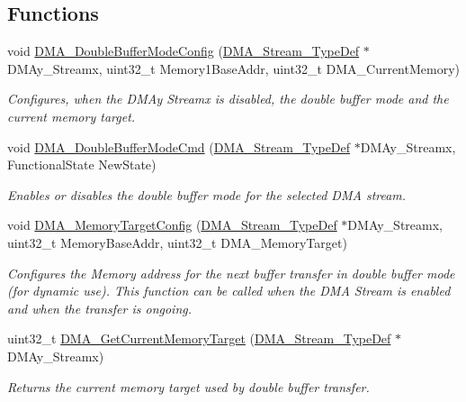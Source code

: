 \subsection*{Functions}
\begin{DoxyCompactItemize}
\item 
void \hyperlink{group___d_m_a___group3_ga8d0957e50302efaf48a16c62d14c9ca8}{D\+M\+A\+\_\+\+Double\+Buffer\+Mode\+Config} (\hyperlink{struct_d_m_a___stream___type_def}{D\+M\+A\+\_\+\+Stream\+\_\+\+Type\+Def} $\ast$D\+M\+Ay\+\_\+\+Streamx, uint32\+\_\+t Memory1\+Base\+Addr, uint32\+\_\+t D\+M\+A\+\_\+\+Current\+Memory)
\begin{DoxyCompactList}\small\item\em Configures, when the D\+M\+Ay Streamx is disabled, the double buffer mode and the current memory target. \end{DoxyCompactList}\item 
void \hyperlink{group___d_m_a___group3_ga7fe09e62ea3125db384829dab59ebe3e}{D\+M\+A\+\_\+\+Double\+Buffer\+Mode\+Cmd} (\hyperlink{struct_d_m_a___stream___type_def}{D\+M\+A\+\_\+\+Stream\+\_\+\+Type\+Def} $\ast$D\+M\+Ay\+\_\+\+Streamx, Functional\+State New\+State)
\begin{DoxyCompactList}\small\item\em Enables or disables the double buffer mode for the selected D\+MA stream. \end{DoxyCompactList}\item 
void \hyperlink{group___d_m_a___group3_ga4ebcffd32eb6968ac61cfb64a6bae258}{D\+M\+A\+\_\+\+Memory\+Target\+Config} (\hyperlink{struct_d_m_a___stream___type_def}{D\+M\+A\+\_\+\+Stream\+\_\+\+Type\+Def} $\ast$D\+M\+Ay\+\_\+\+Streamx, uint32\+\_\+t Memory\+Base\+Addr, uint32\+\_\+t D\+M\+A\+\_\+\+Memory\+Target)
\begin{DoxyCompactList}\small\item\em Configures the Memory address for the next buffer transfer in double buffer mode (for dynamic use). This function can be called when the D\+MA Stream is enabled and when the transfer is ongoing. \end{DoxyCompactList}\item 
uint32\+\_\+t \hyperlink{group___d_m_a___group3_ga74b6624f9faa2f43c9369ddbdeab241c}{D\+M\+A\+\_\+\+Get\+Current\+Memory\+Target} (\hyperlink{struct_d_m_a___stream___type_def}{D\+M\+A\+\_\+\+Stream\+\_\+\+Type\+Def} $\ast$D\+M\+Ay\+\_\+\+Streamx)
\begin{DoxyCompactList}\small\item\em Returns the current memory target used by double buffer transfer. \end{DoxyCompactList}\end{DoxyCompactItemize}


